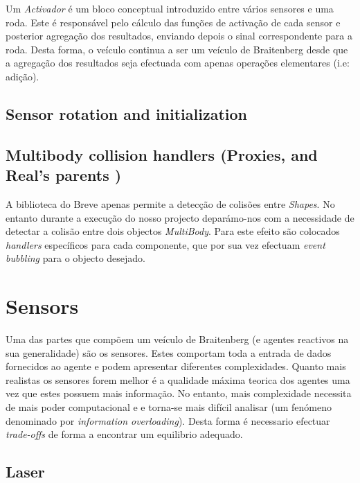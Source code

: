 \documentclass[a4paper]{article}
\begin{document}
Um \emph{Activador} é um bloco conceptual introduzido entre vários sensores e uma roda.
Este é responsável pelo cálculo das funções de activação de cada sensor e posterior agregação dos resultados, enviando depois o sinal correspondente para a roda.  
Desta forma, o veículo continua a ser um veículo de Braitenberg desde que a agregação dos resultados seja efectuada com apenas operações elementares (i.e: adição). 


\subsection{Sensor rotation and initialization}
\indent \indent 

\subsection{Multibody collision handlers (Proxies, and Real's parents )}
\indent \indent A biblioteca do Breve apenas permite a detecção de colisões entre \emph{Shapes}. 
No entanto durante a execução do nosso projecto deparámo-nos com a necessidade de detectar a colisão entre dois objectos \emph{MultiBody}.
Para este efeito são colocados \emph{handlers} específicos para cada componente, que por sua vez efectuam \emph{event bubbling} para o objecto desejado.

\cleardoublepage
\section{Sensors}
\indent \indent Uma das partes que compõem um veículo de Braitenberg (e agentes reactivos na sua generalidade) são os sensores.
Estes comportam toda a entrada de dados fornecidos ao agente e podem apresentar diferentes complexidades.
Quanto mais realistas os sensores forem melhor é a qualidade máxima teorica dos agentes uma vez que estes possuem mais informação.
No entanto, mais complexidade necessita de mais poder computacional e e torna-se mais difícil analisar (um fenómeno denominado por \emph{information overloading}).
Desta forma é necessario efectuar \emph{trade-offs} de forma a encontrar um equilibrio adequado.

\cleardoublepage
\subsection{Laser}
\end{document}
